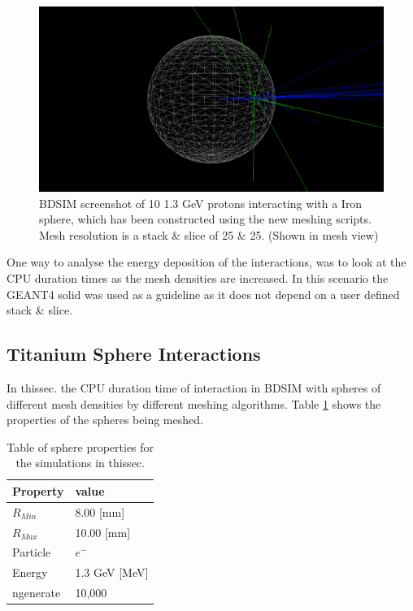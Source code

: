 \documentclass[12pt,a4paper]{article}
\begin{document}
\begin{figure}[h!]
\centering
\includegraphics[scale=0.35]{Images//BDSIM//ProtonSphere2.png}
\caption[width=\columnwidth]{BDSIM screenshot of 10 1.3 GeV protons interacting with a Iron sphere, which has been constructed using the new meshing scripts. Mesh resolution is a stack \& slice of 25 \& 25. (Shown in mesh view)}
\label{sphbd}
\end{figure}


\noindent One way to analyse the energy deposition of the interactions, was to look at the CPU duration times as the mesh densities are increased. In this scenario the GEANT4 solid was used as a guideline as it does not depend on a user defined stack \& slice. 

\subsection{Titanium Sphere Interactions}

In thissec. the CPU duration time of interaction in BDSIM with spheres of different mesh densities by different meshing algorithms. Table \ref{tab1} shows the properties of the spheres being meshed.
 
\begin{table}[h!]
\centering
\begin{tabular}{|l|l|}
\hline
Property & value \\ \hline
$R_{Min}$ &  8.00 [mm]\\ \hline
$R_{Max}$ &  10.00 [mm]\\ \hline
Particle &  $e^-$\\ \hline
Energy & 1.3 GeV [MeV]\\ \hline
ngenerate & 10,000\\ \hline
\end{tabular}
\caption{Table of sphere properties for the simulations in thissec.}
\label{tab1}
\end{table}
\end{document}
